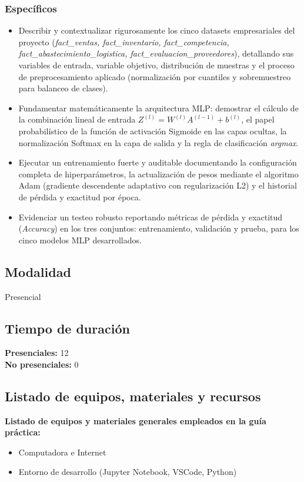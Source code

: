 \documentclass{article}
\begin{document}
\subsubsection{Específicos}
\begin{itemize}
    \item Describir y contextualizar rigurosamente los cinco datasets empresariales del proyecto (\textit{fact\_ventas, fact\_inventario, fact\_competencia, fact\_abastecimiento\_logistica, fact\_evaluacion\_proveedores}), detallando sus variables de entrada, variable objetivo, distribución de muestras y el proceso de preprocesamiento aplicado (normalización por cuantiles y sobremuestreo para balanceo de clases).
    \item Fundamentar matemáticamente la arquitectura MLP: demostrar el cálculo de la combinación lineal de entrada $Z^{(l)} = W^{(l)}A^{(l-1)} + b^{(l)}$, el papel probabilístico de la función de activación Sigmoide en las capas ocultas, la normalización Softmax en la capa de salida y la regla de clasificación \textit{argmax}.
    \item Ejecutar un entrenamiento fuerte y auditable documentando la configuración completa de hiperparámetros, la actualización de pesos mediante el algoritmo Adam (gradiente descendente adaptativo con regularización L2) y el historial de pérdida y exactitud por época.
    \item Evidenciar un testeo robusto reportando métricas de pérdida y exactitud (\textit{Accuracy}) en los tres conjuntos: entrenamiento, validación y prueba, para los cinco modelos MLP desarrollados.
\end{itemize}

\subsection{Modalidad}
Presencial

\subsection{Tiempo de duración}
\textbf{Presenciales:} 12 \\
\textbf{No presenciales:} 0

\subsection{Listado de equipos, materiales y recursos}
\textbf{Listado de equipos y materiales generales empleados en la guía práctica:}
\begin{itemize}
    \item Computadora e Internet
    \item Entorno de desarrollo (Jupyter Notebook, VSCode, Python)
\end{itemize}
\end{document}
